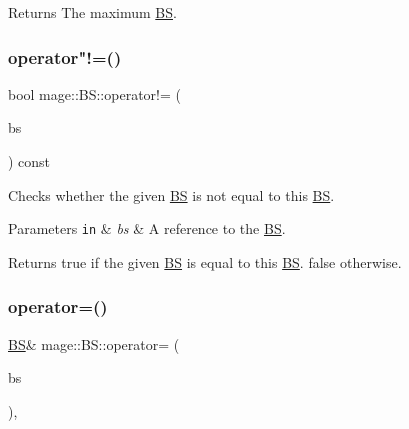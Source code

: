 \begin{DoxyReturn}{Returns}
The maximum \hyperlink{classmage_1_1_b_s}{BS}. 
\end{DoxyReturn}
\hypertarget{classmage_1_1_b_s_aa20fad8f3b8d74b8835e88bd9bda7e78}{}\label{classmage_1_1_b_s_aa20fad8f3b8d74b8835e88bd9bda7e78} 
\subsubsection{\texorpdfstring{operator"!=()}{operator!=()}}
{\footnotesize\ttfamily bool mage\+::\+B\+S\+::operator!= (\begin{DoxyParamCaption}\item[{const \hyperlink{classmage_1_1_b_s}{BS} \&}]{bs }\end{DoxyParamCaption}) const\hspace{0.3cm}{\ttfamily [noexcept]}}

Checks whether the given \hyperlink{classmage_1_1_b_s}{BS} is not equal to this \hyperlink{classmage_1_1_b_s}{BS}.


\begin{DoxyParams}[1]{Parameters}
\mbox{\tt in}  & {\em bs} & A reference to the \hyperlink{classmage_1_1_b_s}{BS}. \\
\hline
\end{DoxyParams}
\begin{DoxyReturn}{Returns}
{\ttfamily true} if the given \hyperlink{classmage_1_1_b_s}{BS} is equal to this \hyperlink{classmage_1_1_b_s}{BS}. {\ttfamily false} otherwise. 
\end{DoxyReturn}
\hypertarget{classmage_1_1_b_s_a2c6a3a8b1fc1f6c073d35e9bff0e5863}{}\label{classmage_1_1_b_s_a2c6a3a8b1fc1f6c073d35e9bff0e5863} 
\subsubsection{\texorpdfstring{operator=()}{operator=()}\hspace{0.1cm}{\footnotesize\ttfamily [1/2]}}
{\footnotesize\ttfamily \hyperlink{classmage_1_1_b_s}{BS}\& mage\+::\+B\+S\+::operator= (\begin{DoxyParamCaption}\item[{const \hyperlink{classmage_1_1_b_s}{BS} \&}]{bs }\end{DoxyParamCaption})\hspace{0.3cm}{\ttfamily [default]}, {\ttfamily [noexcept]}}

